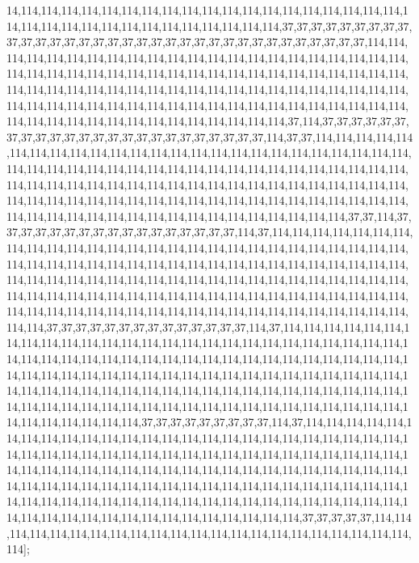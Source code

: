 14,114,114,114,114,114,114,114,114,114,114,114,114,114,114,114,114,114,114,114,114,114,114,114,114,114,114,114,114,114,114,114,114,114,37,37,37,37,37,37,37,37,37,37,37,37,37,37,37,37,37,37,37,37,37,37,37,37,37,37,37,37,37,37,37,37,37,37,114,114,114,114,114,114,114,114,114,114,114,114,114,114,114,114,114,114,114,114,114,114,114,114,114,114,114,114,114,114,114,114,114,114,114,114,114,114,114,114,114,114,114,114,114,114,114,114,114,114,114,114,114,114,114,114,114,114,114,114,114,114,114,114,114,114,114,114,114,114,114,114,114,114,114,114,114,114,114,114,114,114,114,114,114,114,114,114,114,114,114,114,114,114,114,114,37,114,37,37,37,37,37,37,37,37,37,37,37,37,37,37,37,37,37,37,37,37,37,37,37,37,114,37,37,114,114,114,114,114,114,114,114,114,114,114,114,114,114,114,114,114,114,114,114,114,114,114,114,114,114,114,114,114,114,114,114,114,114,114,114,114,114,114,114,114,114,114,114,114,114,114,114,114,114,114,114,114,114,114,114,114,114,114,114,114,114,114,114,114,114,114,114,114,114,114,114,114,114,114,114,114,114,114,114,114,114,114,114,114,114,114,114,114,114,114,114,114,114,114,114,114,114,114,114,114,114,37,37,114,37,37,37,37,37,37,37,37,37,37,37,37,37,37,37,37,37,114,37,114,114,114,114,114,114,114,114,114,114,114,114,114,114,114,114,114,114,114,114,114,114,114,114,114,114,114,114,114,114,114,114,114,114,114,114,114,114,114,114,114,114,114,114,114,114,114,114,114,114,114,114,114,114,114,114,114,114,114,114,114,114,114,114,114,114,114,114,114,114,114,114,114,114,114,114,114,114,114,114,114,114,114,114,114,114,114,114,114,114,114,114,114,114,114,114,114,114,114,114,114,114,114,114,114,114,114,114,114,37,37,37,37,37,37,37,37,37,37,37,37,37,37,114,37,114,114,114,114,114,114,114,114,114,114,114,114,114,114,114,114,114,114,114,114,114,114,114,114,114,114,114,114,114,114,114,114,114,114,114,114,114,114,114,114,114,114,114,114,114,114,114,114,114,114,114,114,114,114,114,114,114,114,114,114,114,114,114,114,114,114,114,114,114,114,114,114,114,114,114,114,114,114,114,114,114,114,114,114,114,114,114,114,114,114,114,114,114,114,114,114,114,114,114,114,114,114,114,114,114,114,114,114,114,114,114,114,114,37,37,37,37,37,37,37,37,37,114,37,114,114,114,114,114,114,114,114,114,114,114,114,114,114,114,114,114,114,114,114,114,114,114,114,114,114,114,114,114,114,114,114,114,114,114,114,114,114,114,114,114,114,114,114,114,114,114,114,114,114,114,114,114,114,114,114,114,114,114,114,114,114,114,114,114,114,114,114,114,114,114,114,114,114,114,114,114,114,114,114,114,114,114,114,114,114,114,114,114,114,114,114,114,114,114,114,114,114,114,114,114,114,114,114,114,114,114,114,114,114,114,114,114,114,114,114,114,114,114,114,37,37,37,37,37,114,114,114,114,114,114,114,114,114,114,114,114,114,114,114,114,114,114,114,114,114,114,114];

